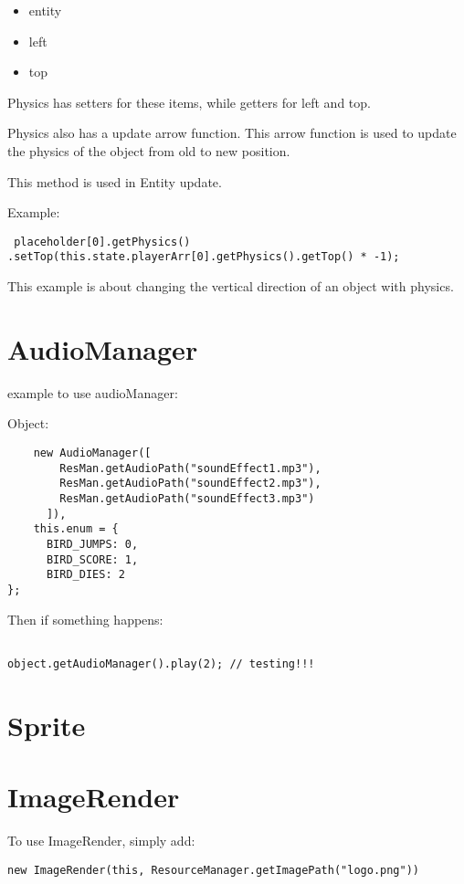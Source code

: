 \begin{itemize}
	\item entity
    \item left
    \item top
\end{itemize}

Physics has setters for these items, while getters for left and top.

Physics also has a update arrow function. This arrow function is used to update the physics of the object from old to new position. 

This method is used in Entity update.

Example:

\begin{lstlisting}
 placeholder[0].getPhysics()
.setTop(this.state.playerArr[0].getPhysics().getTop() * -1);
\end{lstlisting}

This example is about changing the vertical direction of an object with physics.

\section{AudioManager}
example to use audioManager:

Object:
\begin{lstlisting}
    new AudioManager([
        ResMan.getAudioPath("soundEffect1.mp3"),
        ResMan.getAudioPath("soundEffect2.mp3"),
        ResMan.getAudioPath("soundEffect3.mp3")
      ]),    
    this.enum = {
      BIRD_JUMPS: 0,
      BIRD_SCORE: 1,
      BIRD_DIES: 2
};
\end{lstlisting}

Then if something happens:
\begin{lstlisting}

object.getAudioManager().play(2); // testing!!!
\end{lstlisting}


\section{Sprite}


\section{ImageRender}
To use ImageRender, simply add:

\begin{lstlisting}
new ImageRender(this, ResourceManager.getImagePath("logo.png"))
\end{lstlisting}

